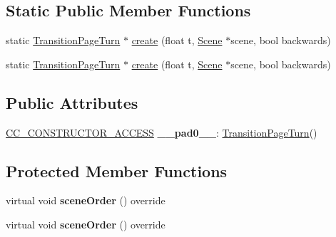 \subsection*{Static Public Member Functions}
\begin{DoxyCompactItemize}
\item 
static \hyperlink{classTransitionPageTurn}{Transition\+Page\+Turn} $\ast$ \hyperlink{classTransitionPageTurn_a3e13201c0b36b7b34bc42dd9a535b0b1}{create} (float t, \hyperlink{classScene}{Scene} $\ast$scene, bool backwards)
\item 
static \hyperlink{classTransitionPageTurn}{Transition\+Page\+Turn} $\ast$ \hyperlink{classTransitionPageTurn_a9db2463de06fa275eaf0724a3ebe265e}{create} (float t, \hyperlink{classScene}{Scene} $\ast$scene, bool backwards)
\end{DoxyCompactItemize}
\subsection*{Public Attributes}
\begin{DoxyCompactItemize}
\item 
\mbox{\label{classTransitionPageTurn_a415b1083abb336819b1335ea1b46395e}} 
\hyperlink{_2cocos2d_2cocos_2base_2ccConfig_8h_a25ef1314f97c35a2ed3d029b0ead6da0}{C\+C\+\_\+\+C\+O\+N\+S\+T\+R\+U\+C\+T\+O\+R\+\_\+\+A\+C\+C\+E\+SS} {\bfseries \+\_\+\+\_\+pad0\+\_\+\+\_\+}\+: \hyperlink{classTransitionPageTurn}{Transition\+Page\+Turn}()
\end{DoxyCompactItemize}
\subsection*{Protected Member Functions}
\begin{DoxyCompactItemize}
\item 
\mbox{\label{classTransitionPageTurn_a8c0b09432be2a3cf0bc5ca4283bb7da3}} 
virtual void {\bfseries scene\+Order} () override
\item 
\mbox{\label{classTransitionPageTurn_ab275507b1b72ba50e55731f7e0026120}} 
virtual void {\bfseries scene\+Order} () override
\end{DoxyCompactItemize}
